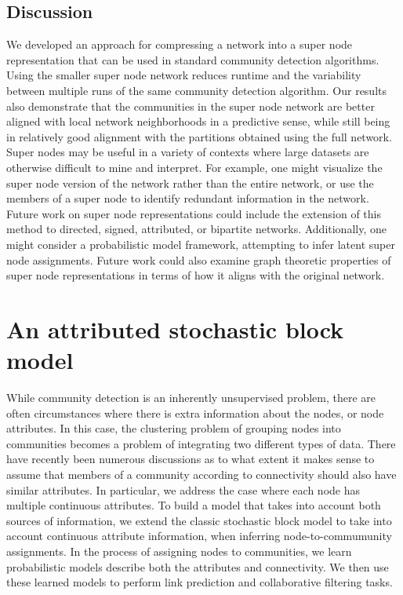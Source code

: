 \section{Discussion}
\indent We developed an approach for compressing a network into a super node representation that can be used in standard community detection algorithms. Using the smaller super node network reduces runtime and the variability between multiple runs of the same community detection algorithm. Our results also demonstrate that the communities in the super node network are better aligned with local network neighborhoods in a predictive sense, while still being in relatively good alignment with the partitions obtained using the full network. \\
\indent Super nodes may be useful in a variety of contexts where large datasets are otherwise difficult to mine and interpret. For example, one might visualize the super node version of the network rather than the entire network, or use the members of a super node to identify redundant information in the network. Future work on super node representations could include the extension of this method to directed, signed, attributed, or bipartite networks. Additionally, one might consider a probabilistic model framework, attempting to infer latent super node assignments. 
Future work could also examine graph theoretic properties of super node representations in terms of how it aligns with the original network. 

\chapter{An attributed stochastic block model}
\indent While community detection is an inherently unsupervised problem, there are often circumstances where there is extra information about the nodes, or node attributes. In this case, the clustering problem of grouping nodes into communities becomes a problem of integrating two different types of data. There have recently been numerous discussions as to what extent it makes sense to assume that members of a community according to connectivity should also have similar attributes. In particular, we address the case where each node has multiple continuous attributes. To build a model that takes into account both sources of information, we extend the classic stochastic block model to take into account continuous attribute information, when inferring node-to-commumunity assignments. In the process of assigning nodes to communities, we learn probabilistic models describe both the attributes and connectivity. We then use these learned models to perform link prediction and collaborative filtering tasks. 

